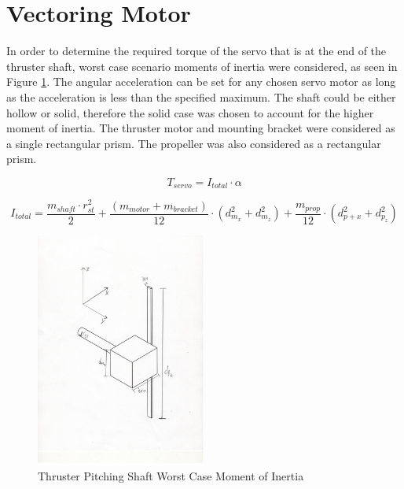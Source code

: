 \documentclass[../main.tex]{subfiles}
\begin{document}
\section{Vectoring Motor} \label{vectoringMotor}
In order to determine the required torque of the servo that is at the end  of the thruster shaft, worst case scenario moments of inertia were considered, as seen in Figure \ref{fig:ThrusterI}. The angular acceleration can be set for any chosen servo motor as long as the acceleration is less than the specified maximum. The shaft could be either hollow or solid, therefore the solid case was chosen to account for the higher moment of inertia. The thruster motor and mounting bracket were considered as a single rectangular prism. The propeller was also considered as a rectangular prism.

\begin{equation}
T_{servo} = I_{total}\cdot{}\alpha
\end{equation}

\begin{equation}
I_{total} = \frac{m_{shaft}\cdot{}r_{st}^2}{2} + \frac{(m_{motor} + m_{bracket})}{12} \cdot{}(d_{m_{x}}^2 + d_{m_{z}}^2) + \frac{m_{prop}}{12}\cdot{}(d_{p+{x}}^2 + d_{p_{z}}^2)
\end{equation}

\begin{figure}[H]
	\centering
	\includegraphics[width=0.5\textwidth]{img/analysis/thruster/thruster1.pdf}
	\caption{Thruster Pitching Shaft Worst Case Moment of Inertia}
	\label{fig:ThrusterI}
\end{figure}
\end{document}
